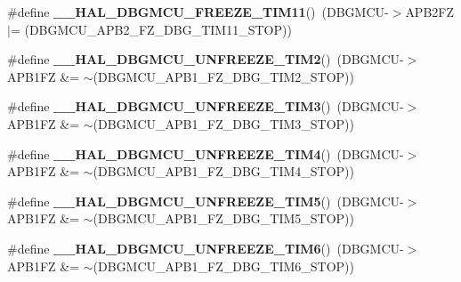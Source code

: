 \begin{DoxyCompactItemize}
\item 
\#define {\bfseries \+\_\+\+\_\+\+H\+A\+L\+\_\+\+D\+B\+G\+M\+C\+U\+\_\+\+F\+R\+E\+E\+Z\+E\+\_\+\+T\+I\+M11}()~(D\+B\+G\+M\+CU-\/$>$A\+P\+B2\+FZ $\vert$= (D\+B\+G\+M\+C\+U\+\_\+\+A\+P\+B2\+\_\+\+F\+Z\+\_\+\+D\+B\+G\+\_\+\+T\+I\+M11\+\_\+\+S\+T\+OP))\hypertarget{group___h_a_l___exported___macros_gac1f554993a6d5c7a953dab2c6cc564dd}{}\label{group___h_a_l___exported___macros_gac1f554993a6d5c7a953dab2c6cc564dd}

\item 
\#define {\bfseries \+\_\+\+\_\+\+H\+A\+L\+\_\+\+D\+B\+G\+M\+C\+U\+\_\+\+U\+N\+F\+R\+E\+E\+Z\+E\+\_\+\+T\+I\+M2}()~(D\+B\+G\+M\+CU-\/$>$A\+P\+B1\+FZ \&= $\sim$(D\+B\+G\+M\+C\+U\+\_\+\+A\+P\+B1\+\_\+\+F\+Z\+\_\+\+D\+B\+G\+\_\+\+T\+I\+M2\+\_\+\+S\+T\+OP))\hypertarget{group___h_a_l___exported___macros_gafd40134436233985a840e1cd8eb6c4c3}{}\label{group___h_a_l___exported___macros_gafd40134436233985a840e1cd8eb6c4c3}

\item 
\#define {\bfseries \+\_\+\+\_\+\+H\+A\+L\+\_\+\+D\+B\+G\+M\+C\+U\+\_\+\+U\+N\+F\+R\+E\+E\+Z\+E\+\_\+\+T\+I\+M3}()~(D\+B\+G\+M\+CU-\/$>$A\+P\+B1\+FZ \&= $\sim$(D\+B\+G\+M\+C\+U\+\_\+\+A\+P\+B1\+\_\+\+F\+Z\+\_\+\+D\+B\+G\+\_\+\+T\+I\+M3\+\_\+\+S\+T\+OP))\hypertarget{group___h_a_l___exported___macros_ga5aecefa008a37ef7c6489a2e29415e69}{}\label{group___h_a_l___exported___macros_ga5aecefa008a37ef7c6489a2e29415e69}

\item 
\#define {\bfseries \+\_\+\+\_\+\+H\+A\+L\+\_\+\+D\+B\+G\+M\+C\+U\+\_\+\+U\+N\+F\+R\+E\+E\+Z\+E\+\_\+\+T\+I\+M4}()~(D\+B\+G\+M\+CU-\/$>$A\+P\+B1\+FZ \&= $\sim$(D\+B\+G\+M\+C\+U\+\_\+\+A\+P\+B1\+\_\+\+F\+Z\+\_\+\+D\+B\+G\+\_\+\+T\+I\+M4\+\_\+\+S\+T\+OP))\hypertarget{group___h_a_l___exported___macros_gac73202fc9f0913f52ef70c42b6cab287}{}\label{group___h_a_l___exported___macros_gac73202fc9f0913f52ef70c42b6cab287}

\item 
\#define {\bfseries \+\_\+\+\_\+\+H\+A\+L\+\_\+\+D\+B\+G\+M\+C\+U\+\_\+\+U\+N\+F\+R\+E\+E\+Z\+E\+\_\+\+T\+I\+M5}()~(D\+B\+G\+M\+CU-\/$>$A\+P\+B1\+FZ \&= $\sim$(D\+B\+G\+M\+C\+U\+\_\+\+A\+P\+B1\+\_\+\+F\+Z\+\_\+\+D\+B\+G\+\_\+\+T\+I\+M5\+\_\+\+S\+T\+OP))\hypertarget{group___h_a_l___exported___macros_ga0669527789fb4616ec07ed711a600d04}{}\label{group___h_a_l___exported___macros_ga0669527789fb4616ec07ed711a600d04}

\item 
\#define {\bfseries \+\_\+\+\_\+\+H\+A\+L\+\_\+\+D\+B\+G\+M\+C\+U\+\_\+\+U\+N\+F\+R\+E\+E\+Z\+E\+\_\+\+T\+I\+M6}()~(D\+B\+G\+M\+CU-\/$>$A\+P\+B1\+FZ \&= $\sim$(D\+B\+G\+M\+C\+U\+\_\+\+A\+P\+B1\+\_\+\+F\+Z\+\_\+\+D\+B\+G\+\_\+\+T\+I\+M6\+\_\+\+S\+T\+OP))\hypertarget{group___h_a_l___exported___macros_gaab127b51706a565b72c397e29b145234}{}\label{group___h_a_l___exported___macros_gaab127b51706a565b72c397e29b145234}


\end{DoxyCompactItemize}
